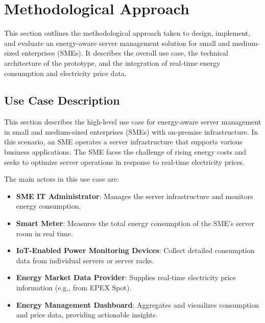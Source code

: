 

\section{Methodological Approach}
This section outlines the methodological approach taken to design, implement, and evaluate an energy-aware server management solution for small and medium-sized enterprises (SMEs).
It describes the overall use case, the technical architecture of the prototype, and the integration of real-time energy consumption and electricity price data.

\subsection{Use Case Description}
This section describes the high-level use case for energy-aware server management in small and medium-sized enterprises (SMEs) with on-premise infrastructure. In this scenario, an SME operates a server infrastructure that supports various business applications. The SME faces the challenge of rising energy costs and seeks to optimize server operations in response to real-time electricity prices.

The main actors in this use case are:
\begin{itemize}
    \item \textbf{SME IT Administrator}: Manages the server infrastructure and monitors energy consumption.
    \item \textbf{Smart Meter}: Measures the total energy consumption of the SME's server room in real time.
    \item \textbf{IoT-Enabled Power Monitoring Devices}: Collect detailed consumption data from individual servers or server racks.
    \item \textbf{Energy Market Data Provider}: Supplies real-time electricity price information (e.g., from EPEX Spot).
    \item \textbf{Energy Management Dashboard}: Aggregates and visualizes consumption and price data, providing actionable insights.    
\end{itemize}

